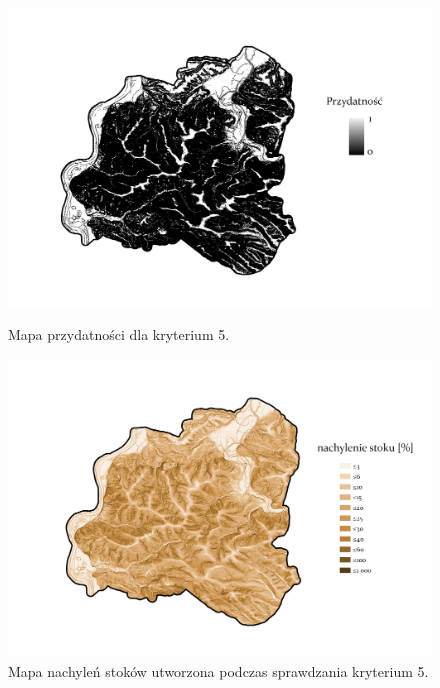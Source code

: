 \documentclass{article}
\begin{document}
\begin{figure}[H]
    \begin{minipage}[t]{0.48\textwidth}
        \centering
        \includegraphics[width=\linewidth]{img/plesna-kryterium5-layout.jpg}
        \caption{Mapa przydatności dla kryterium 5.}
        \label{fig:kryterium5-layout}
    \end{minipage}
    \hfill
    \begin{minipage}[t]{0.48\textwidth}
        \centering
        \includegraphics[width=\linewidth]{img/plesna-kryterium5-stoki.jpg}
        \caption{Mapa nachyleń stoków utworzona podczas sprawdzania kryterium 5.}
        \label{fig:kryterium5-stoki}
    \end{minipage}
\end{figure}
\newpage
\end{document}
